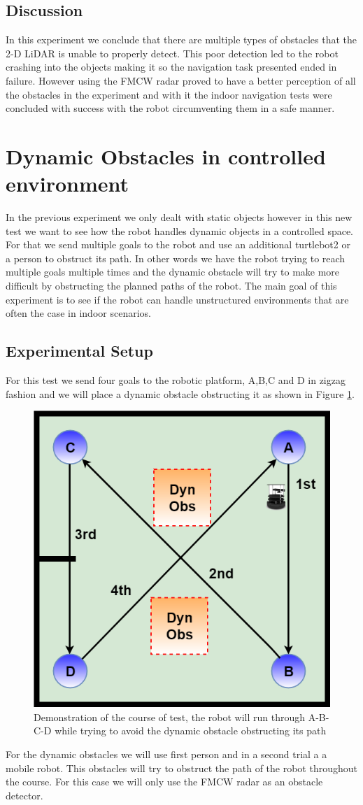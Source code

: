 \subsection{Discussion}
In this experiment we conclude that there are multiple types of obstacles that the 2-D LiDAR is unable to properly detect. This poor detection led to the robot crashing into the objects making it so the navigation task presented ended in failure. However using the \ac{FMCW} radar proved to have a better perception of all the obstacles in the experiment and with it the indoor navigation tests were concluded with success with the robot circumventing them in a safe manner.


\section{Dynamic Obstacles in controlled environment}
In the previous experiment we only dealt with static objects however in this new test we want to see how the robot handles dynamic objects in a controlled space. For that we send multiple goals  to the robot and use an additional turtlebot2 or a person to obstruct its path. In other words we have the robot trying to reach multiple goals multiple times and the dynamic obstacle will try to make more difficult by obstructing the planned paths of the robot.  The main goal of this experiment is to see if the robot can handle unstructured environments that are often the case in indoor scenarios.
\subsection{Experimental Setup}
For this test we send four goals to the robotic platform, A,B,C and D in zigzag fashion and we will place a dynamic obstacle obstructing it as shown in Figure \ref{fig:exp3}.

\begin{figure}[ht!]
\centerline{\includegraphics [width=0.5 \textwidth]{imgs/chapter5/exp3.png}}
\caption[Demonstration of the course of test]{Demonstration of the course of test, the robot will run through A-B-C-D  while  trying to avoid the dynamic obstacle obstructing its path}
\label{fig:exp3}
\end{figure}
For the dynamic obstacles we will use first person and in a second trial a a mobile robot. This obstacles will try to obstruct the path of the robot throughout the course. For this case we will only use the \ac{FMCW} \ac{radar} as an obstacle detector.


